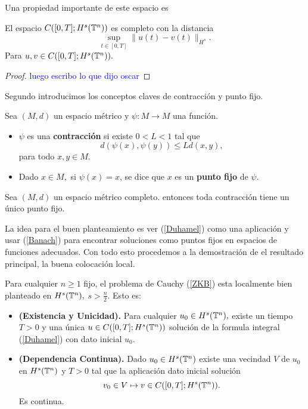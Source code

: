 Una propiedad importante de este espacio es
\begin{prop}\label{completezC}
    El espacio $C([0,T];H^s(\mathbb{T}^n))$ es completo con la distancia
    $$\sup_{t\in[0,T]}\|u(t)-v(t)\|_{H^s}.$$
    Para $u,v\in C([0,T];H^s(\mathbb{T}^n)).$
\end{prop}
\begin{proof}
    \textcolor{blue}{luego escribo lo que dijo oscar}
\end{proof}
Segundo introducimos los conceptos claves de contracción y punto fijo.  
\begin{definition}Sea $(M,d)$ un espacio métrico y $\psi:M\to M$ una función.
    \begin{itemize}
        \item $\psi$ es una \textbf{contracción} si existe $0<L<1$ tal que
        $$d(\psi(x),\psi(y))\leq Ld(x,y),$$
        para todo $x,y\in M.$
        \item Dado $x\in M,$ si $\psi(x)=x$, se dice que $x$ es un \textbf{punto fijo} de $\psi.$
    \end{itemize}
\end{definition}
\begin{theorem}\label{Banach}
Sea $(M,d)$ un espacio métrico completo. entonces toda contracción tiene un único punto fijo.   
\end{theorem}
La idea para el buen planteamiento es ver (\ref{Duhamel}) como una aplicación y usar (\ref{Banach}) para encontrar soluciones como puntos fijos en espacios de funciones adecuados. Con todo esto procedemos a la demostración de el resultado principal, la buena colocación local.
\begin{theorem}
    Para cualquier $n\geq 1$ fijo, el problema de Cauchy (\ref{ZKB}) esta localmente bien planteado en $H^s(\mathbb{T}^n),$ $s>\frac{n}{2}.$ Esto es:
    \begin{itemize}
        \item \textbf{(Existencia y Unicidad).} Para cualquier $u_0\in H^s(\mathbb{T}^n),$ existe un tiempo $T>0$ y una única $u\in C([0,T];H^s(\mathbb{T}^n))$ solución de la formula integral (\ref{Duhamel}) con dato inicial $u_0.$
        \item \textbf{(Dependencia Continua).} Dado $u_0\in H^s(\mathbb{T}^n)$ existe una vecindad $V$ de $u_0$ en $H^s(\mathbb{T}^n)$ y $T>0$ tal que la aplicación dato inicial solución 
        $$v_0\in V\mapsto v\in C([0,T];H^s(\mathbb{T}^n)). $$ 
        Es continua. 
    \end{itemize}
\end{theorem}
